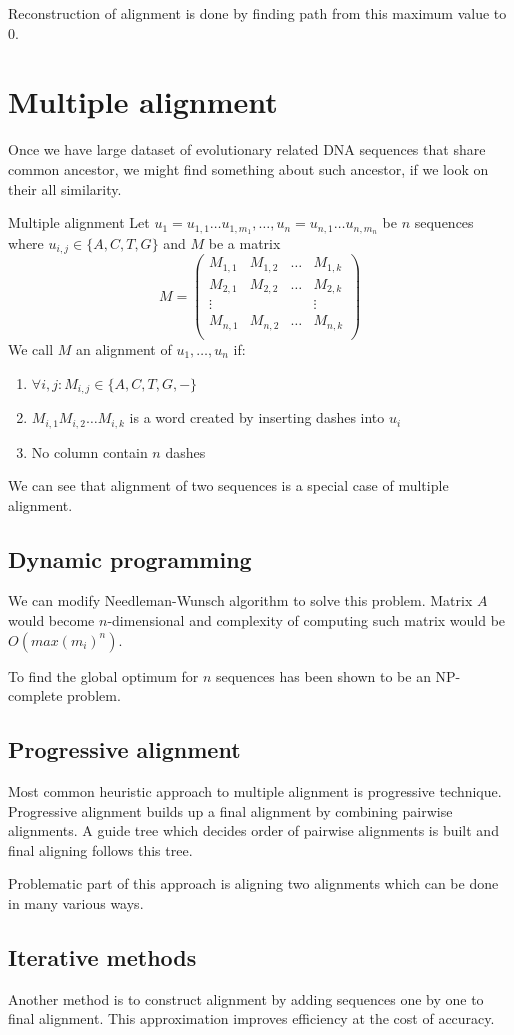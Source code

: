 Reconstruction of alignment is done by finding path from this maximum value to $0$.

\section{Multiple alignment}
Once we have large dataset of evolutionary related DNA sequences that share common ancestor, we might find something about such ancestor, if we look on their all similarity.

\begin{definition}{Multiple alignment}
Let $u_1=u_{1,1} \dots u_{1,m_1}, \ldots, u_n=u_{n,1} \dots u_{n,m_n}$ be $n$ sequences where $u_{i,j} \in \{A, C, T, G\}$ and $M$ be a matrix
$$M=
\begin{pmatrix}
  M_{1,1} & M_{1,2} & \dots & M_{1,k} \\
  M_{2,1} & M_{2,2} & \dots & M_{2,k} \\
  \vdots&&&\vdots\\
  M_{n,1} & M_{n,2} & \dots & M_{n,k} \\
\end{pmatrix}$$
We call $M$ an alignment of $u_1, \dots, u_n$ if:
\begin{enumerate}
\item $\forall i,j : M_{i,j}\in \{A,C,T,G,-\}$
\item $M_{i,1} M_{i,2} \dots M_{i,k}$ is a word created by inserting dashes into $u_i$
\item No column contain $n$ dashes
\end{enumerate}
\end{definition}

We can see that alignment of two sequences is a special case of multiple alignment.

\subsection{Dynamic programming}
We can modify Needleman-Wunsch algorithm to solve this problem.
Matrix $A$ would become $n$-dimensional and complexity of computing such matrix would be $O(max(m_i)^n)$.

To find the global optimum for $n$ sequences has been shown to be an NP-complete problem.\cite{wang1994complexity}

\subsection{Progressive alignment}
Most common heuristic approach to multiple alignment is progressive technique.
Progressive alignment builds up a final alignment by combining pairwise alignments.
A guide tree which decides order of pairwise alignments is built and final aligning follows this tree.

Problematic part of this approach is aligning two alignments which can be done in many various ways.

\subsection{Iterative methods}
Another method is to construct alignment by adding sequences one by one to final alignment.
This approximation improves efficiency at the cost of accuracy. 
